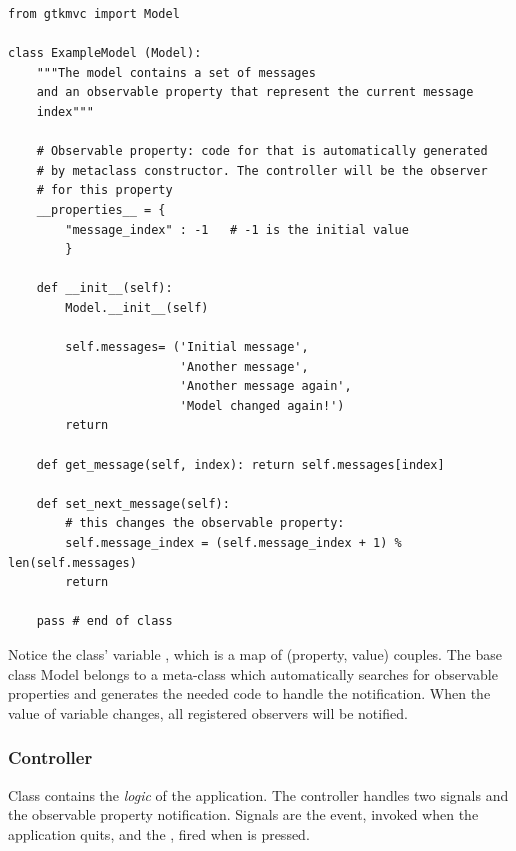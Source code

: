 { \codesize 
\begin{verbatim} 
from gtkmvc import Model

class ExampleModel (Model):
    """The model contains a set of messages
    and an observable property that represent the current message
    index"""

    # Observable property: code for that is automatically generated
    # by metaclass constructor. The controller will be the observer
    # for this property
    __properties__ = {
        "message_index" : -1   # -1 is the initial value
        }

    def __init__(self):
        Model.__init__(self)

        self.messages= ('Initial message',
                        'Another message', 
                        'Another message again',
                        'Model changed again!')
        return

    def get_message(self, index): return self.messages[index]

    def set_next_message(self):
        # this changes the observable property:
        self.message_index = (self.message_index + 1) % len(self.messages)
        return

    pass # end of class

\end{verbatim}
}

Notice the class' variable , which is a
map of (property, value) couples. The base class Model belongs to a
meta-class which automatically searches for observable properties and
generates the needed code to handle the notification.  When the value
of variable  changes, all registered
observers will be notified.


\subsubsection{Controller}
Class  contains the \emph{logic} of the
application. The controller handles two signals and the observable
property notification. Signals are the  event,
invoked when the application quits, and the
, fired when  is
pressed.

